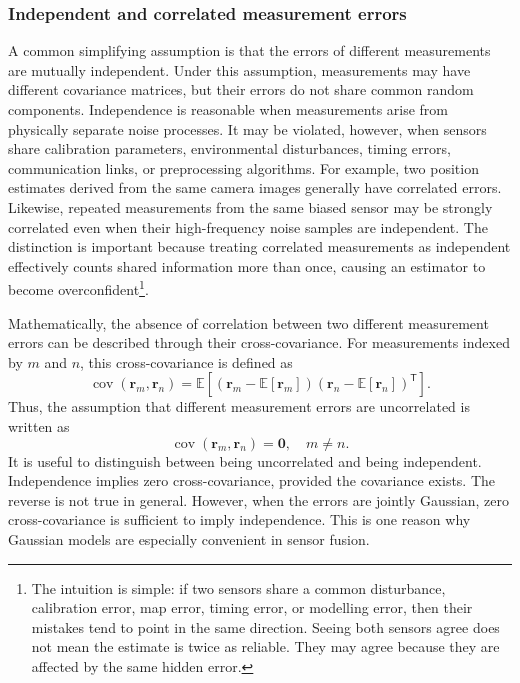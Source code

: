 \documentclass{ieeeaccess}
\begin{document}
\subsubsection{Independent and correlated measurement errors}
A common simplifying assumption is that the errors of different measurements are mutually independent. Under this assumption, measurements may have different covariance matrices, but their errors do not share common random components. Independence is reasonable when measurements arise from physically separate noise processes. It may be violated, however, when sensors share calibration parameters, environmental disturbances, timing errors, communication links, or preprocessing algorithms. For example, two position estimates derived from the same camera images generally have correlated errors. Likewise, repeated measurements from the same biased sensor may be strongly correlated even when their high-frequency noise samples are independent. The distinction is important because treating correlated measurements as independent effectively counts shared information more than once, causing an estimator to become overconfident\footnote{The intuition is simple: if two sensors share a common disturbance, calibration error, map error, timing error, or modelling error, then their mistakes tend to point in the same direction. Seeing both sensors agree does not mean the estimate is twice as reliable. They may agree because they are affected by the same hidden error.}.

Mathematically, the absence of correlation between two different measurement errors can be described through their cross-covariance. For measurements indexed by $m$ and $n$, this cross-covariance is defined as
\begin{equation}
\operatorname{cov}(\mathbf{r}_m,\mathbf{r}_n) = \mathbb{E}\left[\left(\mathbf{r}_m-\mathbb{E}[\mathbf{r}_m]\right)\left(\mathbf{r}_n-\mathbb{E}[\mathbf{r}_n]\right)^{\mathsf T}\right].
\end{equation}
Thus, the assumption that different measurement errors are uncorrelated is written as
\begin{equation}
\operatorname{cov}(\mathbf{r}_m,\mathbf{r}_n) = \mathbf{0}, \quad m\neq n.
\end{equation}
It is useful to distinguish between being uncorrelated and being independent. Independence implies zero cross-covariance, provided the covariance exists. The reverse is not true in general. However, when the errors are jointly Gaussian, zero cross-covariance is sufficient to imply independence. This is one reason why Gaussian models are especially convenient in sensor fusion.
\end{document}
